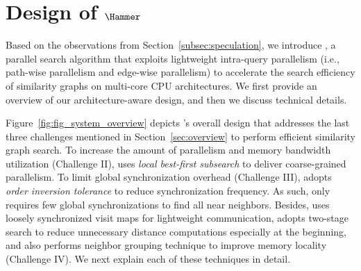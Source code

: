 \section{Design of ${\Hammer}$}

Based on the observations from Section~\ref{subsec:speculation}, we introduce \Hammer, a
parallel search algorithm that exploits lightweight intra-query parallelism (i.e., path-wise parallelism and edge-wise parallelism) to accelerate the search efficiency of similarity graphs on multi-core CPU architectures. We first provide an overview of our architecture-aware design, and then we discuss technical details.

Figure~\ref{fig:fig_system_overview} depicts \Hammer's overall design that addresses the last three challenges mentioned in Section~\ref{sec:overview} to perform efficient similarity graph search.
To increase the amount of parallelism and memory bandwidth utilization (Challenge II), \Hammer uses \emph{local best-first subsearch} to deliver coarse-grained parallelism.
To limit global synchronization overhead (Challenge III), \Hammer adopts \emph{order inversion tolerance} to reduce synchronization frequency.
As such, \Hammer only requires few global synchronizations to find all near neighbors.
Besides, \Hammer uses loosely synchronized visit maps for lightweight communication, adopts two-stage search to reduce unnecessary distance computations especially at the beginning, and also performs neighbor grouping technique to improve memory locality (Challenge IV). We next explain each of these techniques in detail.




